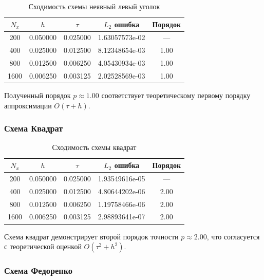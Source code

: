 \documentclass[12pt]{article}
\begin{document}
\begin{table}[H]
    \centering
    \caption{Сходимость схемы неявный левый уголок}
    \label{tab:convergence_implicit_left}
    \begin{tabular}{|c|c|c|c|c|}
        \hline
        $N_x$ & $h$ & $\tau$ & $L_2$ ошибка & Порядок \\
        \hline
        200 & 0.050000 & 0.025000 & 1.63057573e-02 & --- \\
        \hline
        400 & 0.025000 & 0.012500 & 8.12348654e-03 & 1.00 \\
        \hline
        800 & 0.012500 & 0.006250 & 4.05430934e-03 & 1.00 \\
        \hline
        1600 & 0.006250 & 0.003125 & 2.02528569e-03 & 1.00 \\
        \hline
    \end{tabular}
\end{table}

Полученный порядок $p \approx 1.00$ соответствует теоретическому первому порядку аппроксимации $O(\tau + h)$.

\subsubsection*{Схема Квадрат}

\begin{table}[H]
    \centering
    \caption{Сходимость схемы квадрат}
    \label{tab:convergence_box}
    \begin{tabular}{|c|c|c|c|c|}
        \hline
        $N_x$ & $h$ & $\tau$ & $L_2$ ошибка & Порядок \\
        \hline
        200 & 0.050000 & 0.025000 & 1.93549616e-05 & --- \\
        \hline
        400 & 0.025000 & 0.012500 & 4.80644202e-06 & 2.00 \\
        \hline
        800 & 0.012500 & 0.006250 & 1.19758466e-06 & 2.00 \\
        \hline
        1600 & 0.006250 & 0.003125 & 2.98893641e-07 & 2.00 \\
        \hline
    \end{tabular}
\end{table}

Схема квадрат демонстрирует второй порядок точности $p \approx 2.00$, что согласуется с теоретической оценкой $O(\tau^2 + h^2)$.

\subsubsection*{Схема Федоренко}
\end{document}
